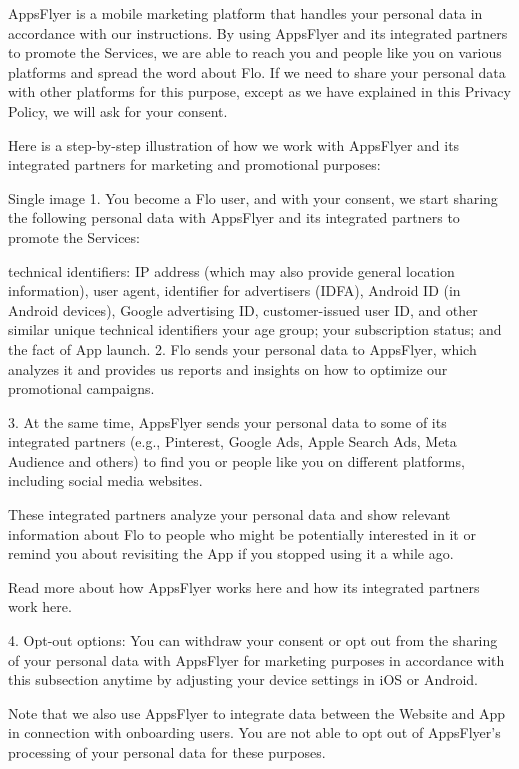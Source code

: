 AppsFlyer is a mobile marketing platform that handles your personal data in accordance with our instructions. By using AppsFlyer and its integrated partners to promote the Services, we are able to reach you and people like you on various platforms and spread the word about Flo. If we need to share your personal data with other platforms for this purpose, except as we have explained in this Privacy Policy, we will ask for your consent. 

Here is a step-by-step illustration of how we work with AppsFlyer and its integrated partners for marketing and promotional purposes:

Single image
1. You become a Flo user, and with your consent, we start sharing the following personal data with AppsFlyer and its integrated partners to promote the Services: 

technical identifiers: IP address (which may also provide general location information), user agent, identifier for advertisers (IDFA), Android ID (in Android devices), Google advertising ID, customer-issued user ID, and other similar unique technical identifiers
your age group;
your subscription status; and
the fact of App launch.
2. Flo sends your personal data to AppsFlyer, which analyzes it and provides us reports and insights on how to optimize our promotional campaigns.

3. At the same time, AppsFlyer sends your personal data to some of its integrated partners (e.g., Pinterest, Google Ads, Apple Search Ads, Meta Audience and others) to find you or people like you on different platforms, including social media websites. 

These integrated partners analyze your personal data and show relevant information about Flo to people who might be potentially interested in it or remind you about revisiting the App if you stopped using it a while ago. 

Read more about how AppsFlyer works here and how its integrated partners work here. 

4. Opt-out options: You can withdraw your consent or opt out from the sharing of your personal data with AppsFlyer for marketing purposes in accordance with this subsection anytime by adjusting your device settings in iOS or Android.

Note that we also use AppsFlyer to integrate data between the Website and App in connection with onboarding users. You are not able to opt out of AppsFlyer’s processing of your personal data for these purposes.

